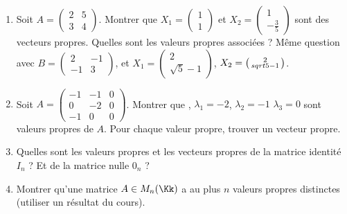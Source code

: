 \documentclass[11pt, class=report,crop=false]{standalone}
\begin{document}
\begin{miniexercices}
\sauteligne
\begin{enumerate}
  \item Soit $A = \left(\begin{smallmatrix}2 & 5 \\3 & 4 \end{smallmatrix}\right)$.
  Montrer que $X_1 = \left(\begin{smallmatrix}1\\1 \end{smallmatrix}\right)$ et
  $X_2 = \left(\begin{smallmatrix}1\\-\frac35 \end{smallmatrix}\right)$ sont des vecteurs propres. Quelles sont les valeurs propres associées ?
  Même question avec 
  $B = \left(\begin{smallmatrix} 2 & -1 \\-1 & 3\end{smallmatrix}\right)$, 
  et $X_1 = \left(\begin{smallmatrix}2\\\sqrt{5}-1\end{smallmatrix}\right)$,
  $X_2 = \left(\begin{smallmatrix}2\\\-sqrt{5}-1\end{smallmatrix}\right)$.
  
  \item Soit $A = \left(\begin{smallmatrix}
  -1 & -1 & 0 \\
0 & -2 & 0 \\
-1 & 0 & 0\end{smallmatrix}\right)$.
Montrer que , $\lambda_1 = -2$, $\lambda_2 = -1$ $\lambda_3 = 0$ sont valeurs propres de $A$.
Pour chaque valeur propre, trouver un vecteur propre.
    
  \item Quelles sont les valeurs propres et les vecteurs propres de la matrice identité
  $I_n$ ? Et de la matrice nulle $0_n$ ?
  
  \item Montrer qu'une matrice $A \in M_n(\Kk)$ a au plus $n$ valeurs propres distinctes (utiliser un résultat du cours).
  

\end{enumerate}
\end{miniexercices}
\end{document}
